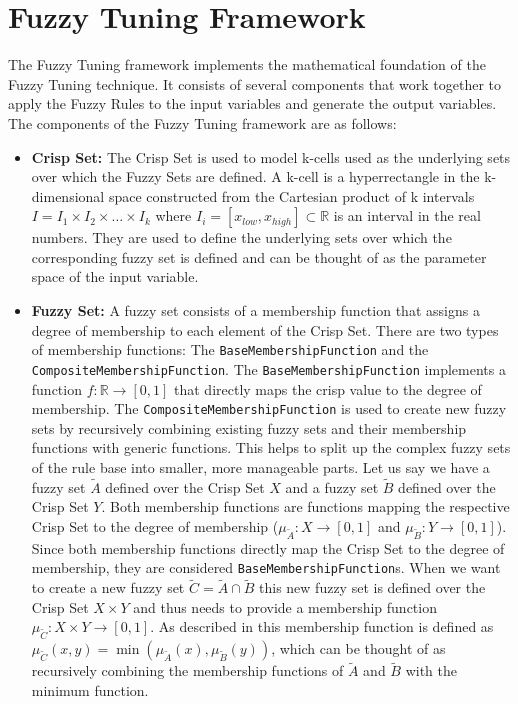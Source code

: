 \section{Fuzzy Tuning Framework}

The Fuzzy Tuning framework implements the mathematical foundation of the Fuzzy Tuning technique. It consists of several components that work together to apply the Fuzzy Rules to the input variables and generate the output variables. The components of the Fuzzy Tuning framework are as follows:

\begin{itemize}
  \item \textbf{Crisp Set:} The Crisp Set is used to model k-cells used as the underlying sets over which the Fuzzy Sets are defined. A k-cell is a hyperrectangle in the k-dimensional space constructed from the Cartesian product of k intervals $I = I_1 \times I_2 \times \ldots \times I_k$ where $I_i = [x_{low}, x_{high}] \subset \mathbb{R} $ is an interval in the real numbers. They are used to define the underlying sets over which the corresponding fuzzy set is defined and can be thought of as the parameter space of the input variable.


  \item \textbf{Fuzzy Set:} A fuzzy set consists of a membership function that assigns a degree of membership to each element of the Crisp Set. There are two types of membership functions: The \texttt{BaseMembershipFunction} and the \texttt{CompositeMembershipFunction}. The \texttt{BaseMembershipFunction} implements a function $f: \mathbb{R} \rightarrow [0, 1]$ that directly maps the crisp value to the degree of membership. The \texttt{CompositeMembershipFunction} is used to create new fuzzy sets by recursively combining existing fuzzy sets and their membership functions with generic functions. This helps to split up the complex fuzzy sets of the rule base into smaller, more manageable parts. Let us say we have a fuzzy set $\tilde{A}$ defined over the Crisp Set $X$ and a fuzzy set $\tilde{B}$ defined over the Crisp Set $Y$. Both membership functions are functions mapping the respective Crisp Set to the degree of membership ($\mu_{\tilde{A}}: X \rightarrow [0, 1]$ and $\mu_{\tilde{B}}: Y \rightarrow [0, 1]$). Since both membership functions directly map the Crisp Set to the degree of membership, they are considered \texttt{BaseMembershipFunction}s. When we want to create a new fuzzy set $\tilde{C} = \tilde{A} \cap \tilde{B}$ this new fuzzy set is defined over the Crisp Set $X \times Y$  and thus needs to provide a membership function $\mu_{\tilde{C}}: X \times Y \rightarrow [0, 1]$. As described in  this membership function is defined as $\mu_{\tilde{C}}(x, y) = \min(\mu_{\tilde{A}}(x), \mu_{\tilde{B}}(y))$, which can be thought of as recursively combining the membership functions of $\tilde{A}$ and $\tilde{B}$ with the minimum function.


\end{itemize}
